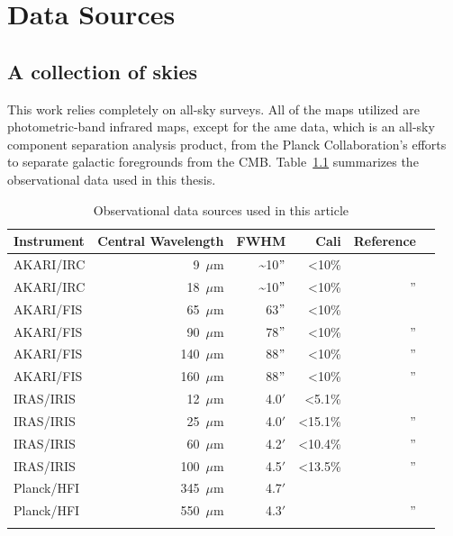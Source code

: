 
\chapter{Data Sources}
  \label{ch:datasources}

  \section{A collection of skies}
    This work relies completely on all-sky surveys. All of the maps utilized are photometric-band infrared maps, except for the \acrshort{ame} data, which is an all-sky component separation analysis product, from the Planck Collaboration's efforts to separate galactic foregrounds from the CMB. Table~\ref{tab:data} summarizes the observational data used in this thesis.
    \begin{table}[h]
      \caption{Observational data sources used in this article}
      \centering
        \begin{tabular}{lrrrrr}
        \hline\hline
        Instrument & Central Wavelength & FWHM & Cali & Reference \\
        \hline
        AKARI/IRC & 9~$\mu$m  &  \textasciitilde{}10$"$ & \textless 10\%   & \tablefootnote{\cite{ishihara10}} \\
        AKARI/IRC & 18~$\mu$m & \textasciitilde{}10$"$  & \textless 10\%     & '' \\
        AKARI/FIS & 65~$\mu$m  & 63$"$ & \textless 10\% & \tablefootnote{\cite{doi15,takita16}} \\
        AKARI/FIS & 90~$\mu$m  & 78$"$ & \textless 10\%   & '' \\
        AKARI/FIS & 140~$\mu$m & 88$"$ & \textless 10\%   & '' \\
        AKARI/FIS & 160~$\mu$m & 88$"$ & \textless 10\%   & '' \\
        IRAS/IRIS & 12~$\mu$m   & 4.0$'$ &   \textless 5.1\%       & \tablefootnote{\cite{iris05}} \\
        IRAS/IRIS & 25~$\mu$m   & 4.0$'$ &    \textless 15.1\%      & ''\\
        IRAS/IRIS & 60~$\mu$m   & 4.2$'$ &    \textless 10.4\%      & '' \\
        IRAS/IRIS & 100~$\mu$m  & 4.5$'$ &   \textless 13.5\%       & '' \\
        Planck/HFI & 345~$\mu$m & 4.7$'$ & & \tablefootnote{\cite{hfi14viii}} \\
        Planck/HFI & 550~$\mu$m & 4.3$'$& & '' \\
        \hline
         \label{tab:data}
      \end{tabular}
    \end{table}
